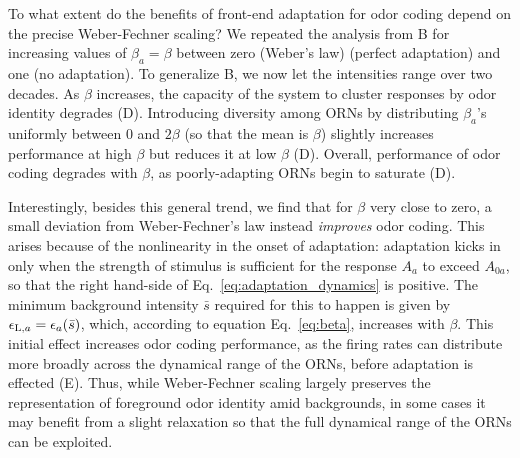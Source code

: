 \documentclass[9pt,lineno]{elife}
\begin{document}
{\color{blue} 

To what extent do the benefits of front-end adaptation for odor coding depend on the precise Weber-Fechner scaling? We repeated the analysis from B for increasing values of $\beta_a=\beta$ between zero (Weber's law) (perfect adaptation) and one (no adaptation). To generalize B, we now let the intensities range over two decades.  As $\beta$ increases, the capacity of the system to cluster responses by odor identity degrades (D). Introducing diversity among ORNs by distributing $\beta_a$'s uniformly between 0 and $2\beta$ (so that the mean is $\beta$) slightly increases performance at high $\beta$ but reduces it at low $\beta$ (D). Overall, performance of odor coding degrades with $\beta$, as poorly-adapting ORNs begin to saturate (D). 

Interestingly, besides this general trend, we find that for $\beta$ very close to zero, a small deviation from Weber-Fechner's law instead \textit{improves} odor coding. This arises because of the nonlinearity in the onset of adaptation: adaptation kicks in only when the strength of stimulus is sufficient for the response $A_a$ to exceed $A_{0a}$, so that the right hand-side of Eq.~\ref{eq:adaptation_dynamics} is positive. The minimum background intensity $\bar{s}$ required for this to happen is given by $\epsilon_{\textup{L}, a}=\epsilon_a(\bar{s})$, which, according to equation Eq.~\ref{eq:beta}, increases with $\beta$. This initial effect increases odor coding performance, as the firing rates can distribute more broadly across the dynamical range of the ORNs, before adaptation is effected (E). Thus, while Weber-Fechner scaling largely preserves the representation of foreground odor identity amid backgrounds, in some cases it may benefit from a slight relaxation so that the full dynamical range of the ORNs can be exploited.
}





\end{document}
